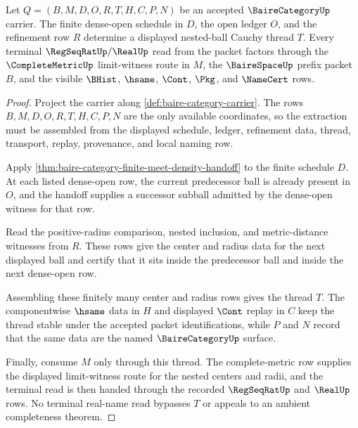 \begin{theorem}
\label{thm:baire-category-complete-metric-thread-extraction}
Let $Q=(B,M,D,O,R,T,H,C,P,N)$ be an accepted $\BaireCategoryUp$ carrier. The
finite dense-open schedule in $D$, the open ledger $O$, and the refinement row
$R$ determine a displayed nested-ball Cauchy thread $T$. Every terminal
$\RegSeqRatUp/\RealUp$ read from the packet factors through the
$\CompleteMetricUp$ limit-witness route in $M$, the $\BaireSpaceUp$ prefix
packet $B$, and the visible $\BHist$, $\hsame$, $\Cont$, $\Pkg$, and
$\NameCert$ rows.
\end{theorem}
\begin{proof}
Project the carrier along \autoref{def:baire-category-carrier}. The rows
$B,M,D,O,R,T,H,C,P,N$ are the only available coordinates, so the extraction
must be assembled from the displayed schedule, ledger, refinement data, thread,
transport, replay, provenance, and local naming row.

Apply \autoref{thm:baire-category-finite-meet-density-handoff} to the finite
schedule $D$. At each listed dense-open row, the current predecessor ball is
already present in $O$, and the handoff supplies a successor subball admitted by
the dense-open witness for that row.

Read the positive-radius comparison, nested inclusion, and metric-distance
witnesses from $R$. These rows give the center and radius data for the next
displayed ball and certify that it sits inside the predecessor ball and inside
the next dense-open row.

Assembling these finitely many center and radius rows gives the thread $T$.
The componentwise $\hsame$ data in $H$ and displayed $\Cont$ replay in $C$ keep
the thread stable under the accepted packet identifications, while $P$ and $N$
record that the same data are the named $\BaireCategoryUp$ surface.

Finally, consume $M$ only through this thread. The complete-metric row supplies
the displayed limit-witness route for the nested centers and radii, and the
terminal read is then handed through the recorded $\RegSeqRatUp$ and $\RealUp$
rows. No terminal real-name read bypasses $T$ or appeals to an ambient
completeness theorem.
\end{proof}

